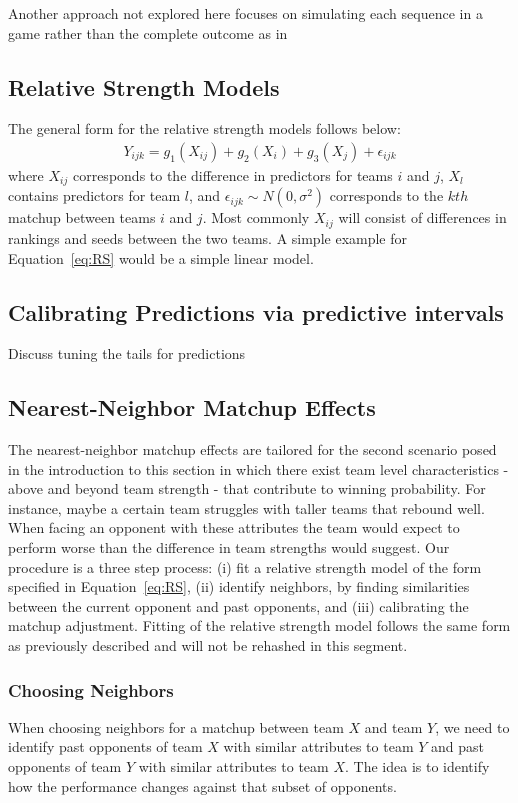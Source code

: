 Another approach not explored here focuses on simulating each sequence in a game rather than the complete outcome as in \cite{vstrumbelj2012}
\subsection{Relative Strength Models}
The general form for the relative strength models follows below:
\begin{eqnarray}
Y_{ijk} = g_1(X_{ij}) + g_2(X_i) + g_3(X_j) +  \epsilon_{ijk}
\label{eq:RS}
\end{eqnarray}
where $X_{ij}$ corresponds to the difference in predictors for teams $i$ and $j$, $X_l$ contains predictors for team $l$, and $\epsilon_{ijk} \sim N(0,\sigma^2)$ corresponds to the $kth$ matchup between teams $i$ and $j$.  Most commonly $X_{ij}$ will consist of differences in rankings and seeds between the two teams.  A simple example for Equation~\ref{eq:RS} would be a simple linear model.

\subsection{Calibrating Predictions via predictive intervals} Discuss tuning the tails for predictions

\subsection{Nearest-Neighbor Matchup Effects}
The nearest-neighbor matchup effects are tailored for the second scenario posed in the introduction to this section in which there exist team level characteristics - above and beyond team strength - that contribute to winning probability.  For instance, maybe a certain team struggles with taller teams that rebound well.  When facing an opponent with these attributes the team would expect to perform worse than the difference in team strengths would suggest.  Our procedure is a three step process: (i) fit a relative strength model of the form specified in Equation~\ref{eq:RS}, (ii) identify neighbors, by finding similarities between the current opponent and past opponents, and (iii) calibrating the matchup adjustment.  Fitting of the relative strength model follows the same form as previously described and will not be rehashed in this segment.
\subsubsection{Choosing Neighbors}
When choosing neighbors for a matchup between team $X$ and team $Y$, we need to identify past opponents of team $X$ with similar attributes to team $Y$ and past opponents of team $Y$ with similar attributes to team $X.$  The idea is to identify how the performance changes against that subset of opponents.


